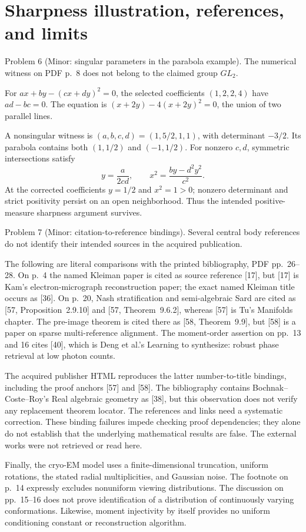 \documentclass[10pt]{article}
\begin{document}
\section*{Sharpness illustration, references, and limits}
Problem 6 (Minor: singular parameters in the parabola example).  The numerical witness on PDF p. 8 does not belong to the claimed group \(GL_2\).\par
For \(ax+by-(cx+dy)^2=0\), the selected coefficients \((1,2,2,4)\) have \(ad-bc=0\). The equation is \((x+2y)-4(x+2y)^2=0\), the union of two parallel lines.\par
A nonsingular witness is \((a,b,c,d)=(1,5/2,1,1)\), with determinant \(-3/2\). Its parabola contains both \((1,1/2)\) and \((-1,1/2)\). For nonzero \(c,d\), symmetric intersections satisfy \[y=\frac{a}{2cd},\qquad
 x^2=\frac{by-d^2y^2}{c^2}.\] At the corrected coefficients \(y=1/2\) and \(x^2=1>0\); nonzero determinant and strict positivity persist on an open neighborhood. Thus the intended positive-measure sharpness argument survives.\par
Problem 7 (Minor: citation-to-reference bindings).  Several central body references do not identify their intended sources in the acquired publication.\par
The following are literal comparisons with the printed bibliography, PDF pp. 26–28. On p. 4 the named Kleiman paper is cited as source reference [17], but [17] is Kam’s electron-micrograph reconstruction paper; the exact named Kleiman title occurs as [36]. On p. 20, Nash stratification and semi-algebraic Sard are cited as [57, Proposition 2.9.10] and [57, Theorem 9.6.2], whereas [57] is Tu’s Manifolds chapter. The pre-image theorem is cited there as [58, Theorem 9.9], but [58] is a paper on sparse multi-reference alignment. The moment-order assertion on pp. 13 and 16 cites [40], which is Deng et al.’s Learning to synthesize: robust phase retrieval at low photon counts.\par
The acquired publisher HTML reproduces the latter number-to-title bindings, including the proof anchors [57] and [58]. The bibliography contains Bochnak–Coste–Roy’s Real algebraic geometry as [38], but this observation does not verify any replacement theorem locator. The references and links need a systematic correction. These binding failures impede checking proof dependencies; they alone do not establish that the underlying mathematical results are false. The external works were not retrieved or read here.\par
Finally, the cryo-EM model uses a finite-dimensional truncation, uniform rotations, the stated radial multiplicities, and Gaussian noise. The footnote on p. 14 expressly excludes nonuniform viewing distributions. The discussion on pp. 15–16 does not prove identification of a distribution of continuously varying conformations. Likewise, moment injectivity by itself provides no uniform conditioning constant or reconstruction algorithm.\par
\end{document}
